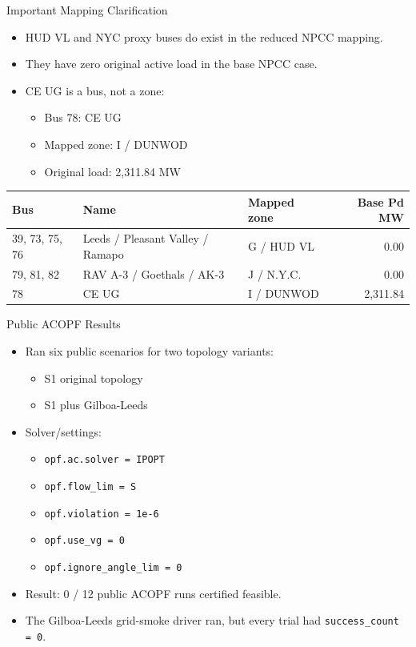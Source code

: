 \documentclass[aspectratio=169,10pt]{beamer}
\newcommand{\bad}[1]{\textcolor{alertred}{#1}}
\begin{document}
\begin{frame}{Important Mapping Clarification}
\begin{itemize}
  \item HUD VL and NYC proxy buses do exist in the reduced NPCC mapping.
  \item They have \bad{zero original active load} in the base NPCC case.
  \item CE UG is a bus, not a zone:
    \begin{itemize}
      \item Bus 78: CE UG
      \item Mapped zone: I / DUNWOD
      \item Original load: 2,311.84 MW
    \end{itemize}
\end{itemize}

\vspace{0.6em}
\scriptsize
\begin{tabularx}{\linewidth}{l l l r}
\toprule
\textbf{Bus} & \textbf{Name} & \textbf{Mapped zone} & \textbf{Base Pd MW} \\
\midrule
39, 73, 75, 76 & Leeds / Pleasant Valley / Ramapo & G / HUD VL & 0.00 \\
79, 81, 82 & RAV A-3 / Goethals / AK-3 & J / N.Y.C. & 0.00 \\
78 & CE UG & I / DUNWOD & 2,311.84 \\
\bottomrule
\end{tabularx}
\end{frame}

\begin{frame}{Public ACOPF Results}
\begin{itemize}
  \item Ran six public scenarios for two topology variants:
    \begin{itemize}
      \item S1 original topology
      \item S1 plus Gilboa-Leeds
    \end{itemize}
  \item Solver/settings:
    \begin{itemize}
      \item \texttt{opf.ac.solver = IPOPT}
      \item \texttt{opf.flow\_lim = S}
      \item \texttt{opf.violation = 1e-6}
      \item \texttt{opf.use\_vg = 0}
      \item \texttt{opf.ignore\_angle\_lim = 0}
    \end{itemize}
  \item Result: \bad{0 / 12 public ACOPF runs certified feasible}.
  \item The Gilboa-Leeds grid-smoke driver ran, but every trial had \texttt{success\_count = 0}.
\end{itemize}
\end{frame}
\end{document}
